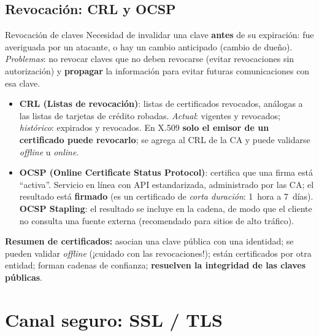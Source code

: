 \documentclass[11pt,a4paper]{article}
\begin{document}
\subsection{Revocación: CRL y OCSP}

\begin{defbox}{Revocación de claves}
Necesidad de invalidar una clave \textbf{antes} de su expiración: fue averiguada por un
atacante, o hay un cambio anticipado (cambio de dueño). \emph{Problemas}: no revocar claves
que no deben revocarse (evitar revocaciones sin autorización) y \textbf{propagar} la
información para evitar futuras comunicaciones con esa clave.
\end{defbox}

\begin{itemize}[leftmargin=1.4em,itemsep=2pt]
  \item \textbf{CRL (Listas de revocación)}: listas de certificados revocados, análogas a las
        listas de tarjetas de crédito robadas. \emph{Actual}: vigentes y revocados;
        \emph{histórico}: expirados y revocados. En X.509 \textbf{solo el emisor de un
        certificado puede revocarlo}; se agrega al CRL de la CA y puede validarse
        \emph{offline} u \emph{online}.
  \item \textbf{OCSP (Online Certificate Status Protocol)}: certifica que una firma está
        ``activa''. Servicio en línea con API estandarizada, administrado por las CA; el
        resultado está \textbf{firmado} (es un certificado de \emph{corta duración}: 1~hora a
        7~días). \textbf{OCSP Stapling}: el resultado se incluye en la cadena, de modo que el
        cliente no consulta una fuente externa (recomendado para sitios de alto tráfico).
\end{itemize}

\begin{slidebox}
\textbf{Resumen de certificados:} asocian una clave pública con una identidad; se pueden
validar \emph{offline} (¡cuidado con las revocaciones!); están certificados por otra entidad;
forman cadenas de confianza; \textbf{resuelven la integridad de las claves públicas}.
\end{slidebox}

\section{Canal seguro: SSL / TLS}
\end{document}
